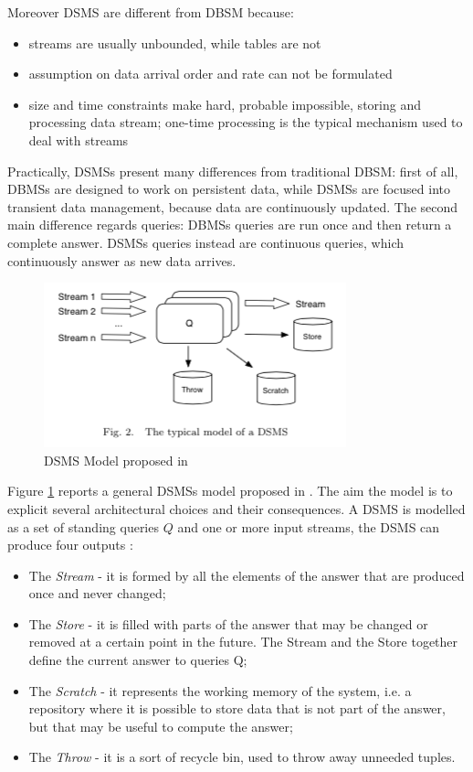 Moreover DSMS are different from DBSM because: 
\begin{itemize}
\item streams are usually unbounded, while tables are not
\item assumption on data arrival order and rate can not be formulated
\item size and time constraints make hard, probable impossible, storing and processing data stream; one-time processing is the typical mechanism used to deal with streams
\end{itemize} 

Practically, DSMSs present many differences from traditional DBSM: first of all, DBMSs are designed to work on persistent data, while DSMSs are focused into transient data management, because data are continuously updated. The second main difference regards queries: DBMSs queries are run once and then return a complete answer. DSMSs queries instead are continuous queries, which continuously answer as new data arrives. 

\begin{figure}[tbh]
  \centering
	\includegraphics[width=0.75\linewidth]{images/dsms}
	\caption{DSMS Model proposed in \cite{Babu:2001:CQO:603867.603884}  } 
  	\label{fig:dsms}
\end{figure}

Figure \ref{fig:dsms} reports a general DSMSs model proposed in \cite{Babu:2001:CQO:603867.603884}. The aim the model is to explicit several architectural choices and their consequences. A DSMS is modelled as a set of standing queries $Q$ and one or more input streams, the DSMS can produce four outputs \cite{Cugola:2012:PFI:2187671.2187677}:

\begin{itemize}
\item The \textit{Stream} - it is formed by all the elements of the answer that are produced once and never changed;
\item The \textit{Store} - it is filled with parts of the answer that may be changed or removed at a certain point in the future. The Stream and the Store together define the current answer to queries Q;
\item The \textit{Scratch} - it represents the working memory of the system, i.e. a repository where it is possible to store data that is not part of the answer, but that may be useful to compute the answer;
\item The \textit{Throw} - it is a sort of recycle bin, used to throw away unneeded tuples.
\end{itemize}


